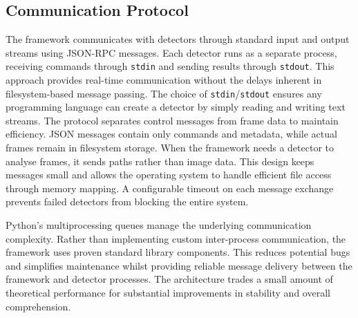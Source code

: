 \subsection{Communication Protocol}
The framework communicates with detectors through standard input and output streams using JSON-RPC messages. Each detector runs as a separate process, receiving commands through \texttt{stdin} and sending results through \texttt{stdout}. This approach provides real-time communication without the delays inherent in filesystem-based message passing. The choice of \texttt{stdin}/\texttt{stdout} ensures any programming language can create a detector by simply reading and writing text streams.
The protocol separates control messages from frame data to maintain efficiency. JSON messages contain only commands and metadata, while actual frames remain in filesystem storage. When the framework needs a detector to analyse frames, it sends paths rather than image data. This design keeps messages small and allows the operating system to handle efficient file access through memory mapping. A configurable timeout on each message exchange prevents failed detectors from blocking the entire system.

Python's multiprocessing queues manage the underlying communication complexity. Rather than implementing custom inter-process communication, the framework uses proven standard library components. This reduces potential bugs and simplifies maintenance whilst providing reliable message delivery between the framework and detector processes. The architecture trades a small amount of theoretical performance for substantial improvements in stability and overall comprehension.
